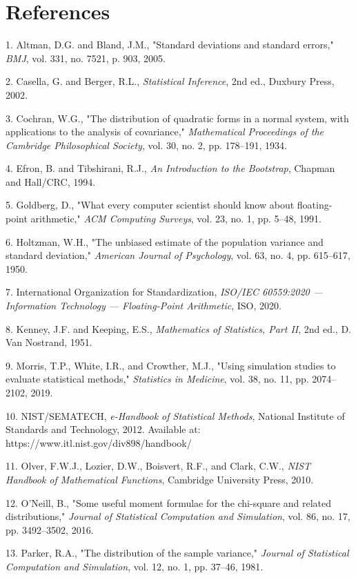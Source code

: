 \documentclass[11pt]{article}
\begin{document}
\section*{References}
\begingroup
\small
1. Altman, D.G. and Bland, J.M., "Standard deviations and standard errors," \textit{BMJ}, vol. 331, no. 7521, p. 903, 2005.\par
2. Casella, G. and Berger, R.L., \textit{Statistical Inference}, 2nd ed., Duxbury Press, 2002.\par
3. Cochran, W.G., "The distribution of quadratic forms in a normal system, with applications to the analysis of covariance," \textit{Mathematical Proceedings of the Cambridge Philosophical Society}, vol. 30, no. 2, pp. 178–191, 1934.\par
4. Efron, B. and Tibshirani, R.J., \textit{An Introduction to the Bootstrap}, Chapman and Hall/CRC, 1994.\par
5. Goldberg, D., "What every computer scientist should know about floating-point arithmetic," \textit{ACM Computing Surveys}, vol. 23, no. 1, pp. 5–48, 1991.\par
6. Holtzman, W.H., "The unbiased estimate of the population variance and standard deviation," \textit{American Journal of Psychology}, vol. 63, no. 4, pp. 615–617, 1950.\par
7. International Organization for Standardization, \textit{ISO/IEC 60559:2020 — Information Technology — Floating-Point Arithmetic}, ISO, 2020.\par
8. Kenney, J.F. and Keeping, E.S., \textit{Mathematics of Statistics, Part II}, 2nd ed., D. Van Nostrand, 1951.\par
9. Morris, T.P., White, I.R., and Crowther, M.J., "Using simulation studies to evaluate statistical methods," \textit{Statistics in Medicine}, vol. 38, no. 11, pp. 2074–2102, 2019.\par
10. NIST/SEMATECH, \textit{e-Handbook of Statistical Methods}, National Institute of Standards and Technology, 2012. Available at: https://www.itl.nist.gov/div898/handbook/\par
11. Olver, F.W.J., Lozier, D.W., Boisvert, R.F., and Clark, C.W., \textit{NIST Handbook of Mathematical Functions}, Cambridge University Press, 2010.\par
12. O'Neill, B., "Some useful moment formulae for the chi-square and related distributions," \textit{Journal of Statistical Computation and Simulation}, vol. 86, no. 17, pp. 3492–3502, 2016.\par
13. Parker, R.A., "The distribution of the sample variance," \textit{Journal of Statistical Computation and Simulation}, vol. 12, no. 1, pp. 37–46, 1981.\par
\end{document}
